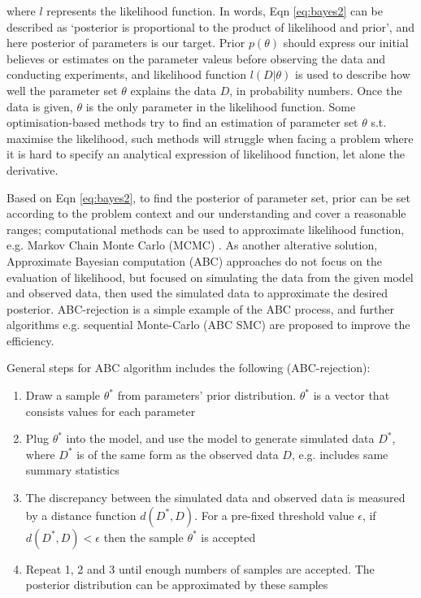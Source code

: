 \documentclass[12pt,a4paper]{report}
\begin{document}
where $l$ represents the likelihood function. In words, Eqn \ref{eq:bayes2} can be described as `posterior is proportional to the product of likelihood and prior', and here posterior of parameters is our target. Prior $p(\theta)$ should express our initial believes or estimates on the parameter valeus before observing the data and conducting experiments, and likelihood function $l(D|\theta)$ is used to describe how well the parameter set $\theta$ explains the data $D$, in probability numbers. Once the data is given, $\theta$ is the only parameter in the likelihood function. Some optimisation-based methods try to find an estimation of parameter set $\theta$ s.t. maximise the likelihood, such methods will struggle when facing a problem where it is hard to specify an analytical expression of likelihood function, let alone the derivative.

Based on Eqn \ref{eq:bayes2}, to find the posterior of parameter set, prior can be set according to the problem context and our understanding and cover a reasonable ranges; computational methods can be used to approximate likelihood function, e.g. Markov Chain Monte Carlo (MCMC) \cite{ref:MCMC}. As another alterative solution, Approximate Bayesian computation (ABC) approaches do not focus on the evaluation of likelihood, but focused on simulating the data from the given model and observed data, then used the simulated data to approximate the desired posterior. ABC-rejection \cite{ABC_rejection} is a simple example of the ABC process, and further algorithms e.g. sequential Monte-Carlo (ABC SMC)\cite{Toni} are proposed to improve the efficiency.

General steps for ABC algorithm includes the following (ABC-rejection):

\begin{enumerate}
    \item Draw a sample $\theta^*$ from parameters' prior distribution. $\theta^*$ is a vector that consists values for each parameter
    \item Plug $\theta^*$ into the model, and use the model to generate simulated data $D^*$, where $D^*$ is of the same form as the observed data $D$, e.g. includes same summary statistics
    \item The discrepancy between the simulated data and observed data is measured by a distance function $d(D^*, D)$. For a pre-fixed threshold value $\epsilon$, if $d(D^*, D)<\epsilon$ then the sample $\theta^*$ is accepted
    \item Repeat 1, 2 and 3 until enough numbers of samples are accepted. The posterior distribution can be approximated by these samples
\end{enumerate}
\end{document}
